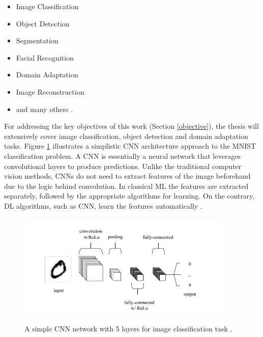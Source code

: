 \documentclass[english, 12pt, a4paper, elec, utf8, a-1b, online]{aaltothesis}
\begin{document}
\begin{itemize}
	\item Image Classification
	\item Object Detection
	\item Segmentation
	\item Facial Recognition
	\item Domain Adaptation
	\item Image Reconstruction
	\item and many others \cite{paperswithcode:2022}.
\end{itemize}

For addressing the key objectives of this work (Section \ref{objective}), the thesis will extensively cover image classification, object detection and domain adaptation tasks. Figure \ref{CNN} illustrates a simplistic CNN architecture approach to the MNIST  \cite{lecun-mnisthandwrittendigit-2010} classification problem. A CNN is essentially a neural network that leverages convolutional layers to produce predictions. Unlike the traditional computer vision methods, CNNs do not need to extract features of the image beforehand due to the logic behind convolution. In classical ML the features are extracted separately, followed by the appropriate algorithms for learning. On the contrary, DL algorithms, such as CNN, learn the features automatically \cite{alom01}.


\begin{figure}[htb]
	\begin{center}
		\includegraphics[height=5cm]{./CNN.png}
	\end{center}
	\caption{A simple CNN network with 5 layers for image classification task \cite{Mahony2019}.}
	\begin{center}
		\label{CNN}
	\end{center}
\end{figure}
\FloatBarrier
\end{document}

